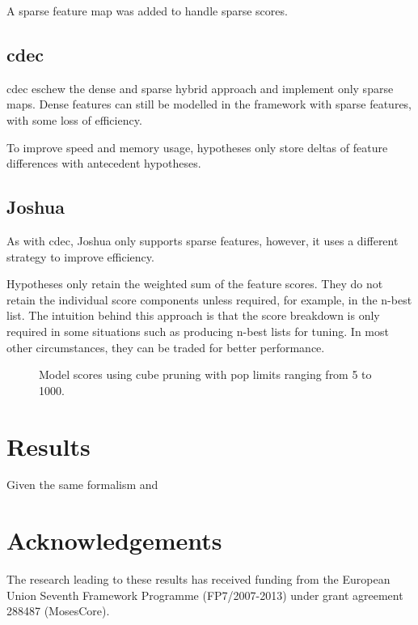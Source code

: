 \documentclass{pbml}
\begin{document}
A sparse feature map was added to handle sparse scores.

\subsection{cdec}
cdec eschew the dense and sparse hybrid approach and implement only sparse maps. Dense features can still be modelled in the framework with sparse features, with some loss of efficiency.

To improve speed and memory usage, hypotheses only store deltas of feature differences with antecedent hypotheses.

\subsection{Joshua}
As with cdec, Joshua only supports sparse features, however, it uses a different strategy to improve efficiency.

Hypotheses only retain the weighted sum of the feature scores. They do not retain the individual score components unless required, for example, in the n-best list. The intuition behind this approach is that the score breakdown is only required in some situations such as producing n-best lists for tuning. In most other circumstances, they can be traded for better performance.
  
\begin{figure}%
%
\caption{\label{model}Model scores using cube pruning with pop limits ranging from 5 to 1000.}%
\end{figure}

\section{Results}

Given the same formalism and 

\section*{Acknowledgements}

The research leading to these results has received funding from the European Union Seventh Framework Programme (FP7/2007-2013) under grant agreement 288487 (MosesCore).




\correspondingaddress
\end{document}
